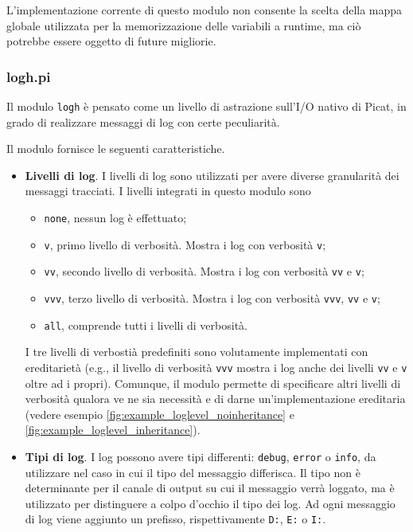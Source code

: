 \documentclass[12pt,a4paper,openright]{book} %
\begin{document}
L'implementazione corrente di questo modulo non consente la scelta
della mappa globale utilizzata per la memorizzazione delle variabili a
runtime, ma ciò potrebbe essere oggetto di future migliorie.

\subsubsection{log\textunderscore h.pi}

Il modulo \texttt{log\textunderscore h} è pensato come un livello di
astrazione sull'I/O nativo di Picat, in grado di realizzare messaggi
di log con certe peculiarità.

Il modulo fornisce le seguenti caratteristiche.

\begin{itemize}
	\item \textbf{Livelli di log}. I livelli di log sono
          utilizzati per avere diverse granularità dei messaggi
          tracciati. I livelli integrati in questo modulo sono
	\begin{itemize}
		\item \texttt{none}, nessun log è effettuato;
		\item \texttt{v}, primo livello di verbosità. Mostra i
                  log con verbosità \texttt{v};
		\item \texttt{vv}, secondo livello di
                  verbosità. Mostra i log con verbosità \texttt{vv} e
                  \texttt{v};
		\item \texttt{vvv}, terzo livello di verbosità. Mostra
                  i log con verbosità \texttt{vvv}, \texttt{vv} e
                  \texttt{v};
		\item \texttt{all}, comprende tutti i livelli di
                  verbosità.
	\end{itemize}
	I tre livelli di verbostià predefiniti sono volutamente
        implementati con ereditarietà (e.g., il livello di verbosità
        \texttt{vvv} mostra i log anche dei livelli \texttt{vv} e
        \texttt{v} oltre ad i propri). Comunque, il modulo permette di
        specificare altri livelli di verbosità qualora ve ne sia
        necessità e di darne un'implementazione ereditaria (vedere
        esempio \ref{fig:example_loglevel_noinheritance} e
        \ref{fig:example_loglevel_inheritance}).

	\item \textbf{Tipi di log}. I log possono avere tipi
          differenti: \texttt{debug}, \texttt{error} o \texttt{info},
          da utilizzare nel caso in cui il tipo del messaggio
          differisca. Il tipo non è determinante per il canale di
          output su cui il messaggio verrà loggato, ma è utilizzato
          per distinguere a colpo d'occhio il tipo dei log. Ad ogni
          messaggio di log viene aggiunto un prefisso, rispettivamente
          \texttt{D:}, \texttt{E:} o \texttt{I:}.


\end{itemize}
\end{document}
